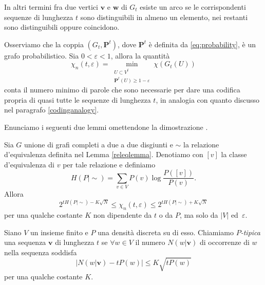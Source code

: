 In altri termini fra due vertici \(\mathbf{v}\) e \(\mathbf{w}\) di \(G_t\) esiste un arco se le corrispondenti sequenze di lunghezza \(t\) sono distinguibili in almeno un elemento, nei restanti sono distinguibili oppure coincidono.

Osserviamo che la coppia \((G_t, \mathbf{P}^t)\), dove \(\mathbf{P}^t\) è definita da \eqref{eq:probability}, è un grafo probabilistico. Sia \(0<\varepsilon <1\), allora la quantità
\[\chi_{n}(t,\varepsilon) = \min_{\substack{U\subset V^{t}\\\mathbf{P}^t(U)\ge 1-\varepsilon}} \chi(G_{t}(U))\]
conta il numero minimo di parole che sono necessarie per dare una codifica propria di quasi tutte le sequenze di lunghezza \(t\), in analogia con quanto discusso nel paragrafo \ref{codinganalogy}.

Enunciamo i seguenti due lemmi omettendone la dimostrazione \cite{Korner1971}. 
\begin{lemma}
  \label{boundslemma} Sia \(G\) unione di grafi completi a due a due disgiunti e \(\sim\) la relazione d'equivalenza definita nel Lemma \ref{releqlemma}. Denotiamo con \([v]\) la classe d'equivalenza di \(v\) per tale relazione e definiamo
  \[H(P\mid \sim)=\sum_{v\in V} P(v)\log{\frac{P([v])}{P(v)}}.\]
  Allora
  \[2^{tH(P\mid \sim)-K\sqrt{N}}\le \chi_{n}(t,\varepsilon)\le 2^{tH(P\mid \sim)+K\sqrt{N}}\]
  per una qualche costante \(K\) non dipendente da \(t\) o da \(P\), ma solo da \(|V|\) ed\ \(\varepsilon\). 
\end{lemma}
\begin{definition}
  Siano \(V\) un insieme finito e \(P\) una densità discreta su di esso. Chiamiamo \emph{\(P\)-tipica} una sequenza \(\mathbf{v}\) di lunghezza \(t\) se \(\forall w\in V\) il numero \(N(w\vert \mathbf{v})\) di occorrenze di \(w\) nella sequenza soddisfa
  \[\Big| N(w\vert\mathbf{v}) - tP(w)\Big|\le K\sqrt{tP(w)}\]
  per una qualche costante \(K\). 
\end{definition}

